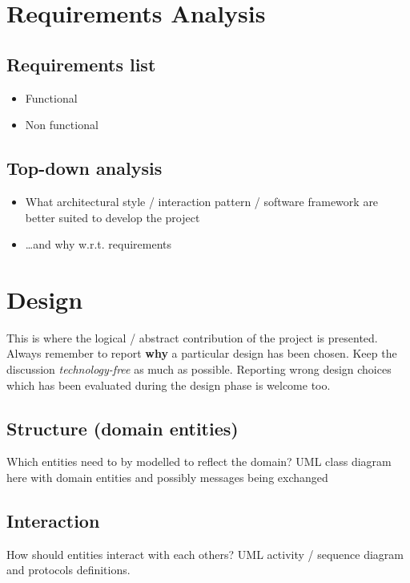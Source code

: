 \documentclass{scrartcl}
\begin{document}
\section{Requirements Analysis}
\label{sec:requirements}

\subsection{Requirements list}
%
\begin{itemize}
    \item Functional
    \item Non functional
\end{itemize}
%

\subsection{Top-down analysis}
%
\begin{itemize}
    \item What architectural style / interaction pattern / software framework are better suited to develop the project
    \item \dots and why w.r.t. requirements
\end{itemize}
%

\section{Design}
\label{sec:design}

This is where the logical / abstract contribution of the project is presented.
%
Always remember to report \textbf{why} a particular design has been chosen.
%
Keep the discussion \emph{technology-free} as much as possible.
%
Reporting wrong design choices which has been evaluated during the design phase is welcome too.

\subsection{Structure (domain entities)}

Which entities need to by modelled to reflect the domain?
%
UML class diagram here with domain entities and possibly messages being exchanged

\subsection{Interaction}

How should entities interact with each others?
%
UML activity / sequence diagram and protocols definitions.
\end{document}
